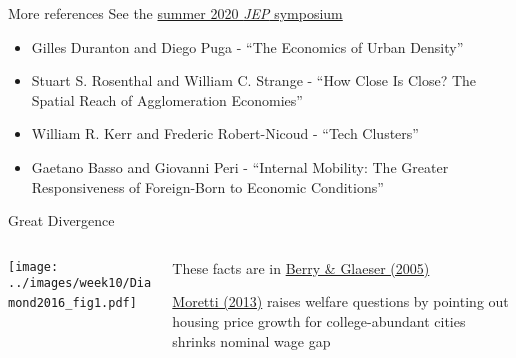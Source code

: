\documentclass[11pt,notes=hide,aspectratio=169]{beamer}
\begin{document}
\appendix
{}
\begin{frame}{More references}
See the \href{https://www.aeaweb.org/issues/602}{summer 2020 \textit{JEP} symposium}
\begin{itemize}
\item Gilles Duranton and Diego Puga - ``The Economics of Urban Density''
\item Stuart S. Rosenthal and William C. Strange - ``How Close Is Close? The Spatial Reach of Agglomeration Economies''
\item William R. Kerr and Frederic Robert-Nicoud - ``Tech Clusters''
\item Gaetano Basso and Giovanni Peri - ``Internal Mobility: The Greater Responsiveness of Foreign-Born to Economic Conditions''
\end{itemize}
\end{frame}
\begin{frame}{Great Divergence}
\begin{columns}
\begin{column}{.60\textwidth}
\begin{center}
\texttt{[image: ../images/week10/Diamond2016\_fig1.pdf]}\
\end{center}
\end{column}
\begin{column}{.38\textwidth}
\begin{itemize}
	\item 
\vspace{-4mm}
{\small
	These facts are in \href{https://onlinelibrary.wiley.com/doi/abs/10.1111/j.1435-5957.2005.00047.x}{Berry \& Glaeser (2005)} \\
	\item 
\href{https://www.aeaweb.org/articles?id=10.1257/app.5.1.65}{Moretti (2013)} raises welfare questions by pointing out housing price growth for college-abundant cities shrinks nominal wage gap\par
}
\end{itemize}
\end{column}
\end{columns}
\end{frame}
\end{document}
